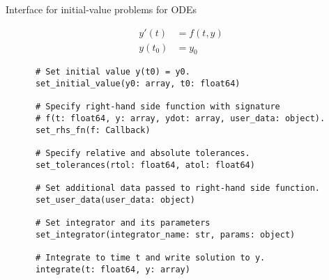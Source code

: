 \documentclass[
  10pt,
  aspectratio=169,
  english,
]{beamer}
\begin{document}
\begin{frame}[fragile]{Interface for initial-value problems for ODEs}
  \begin{minipage}{\dimexpr0.22\textwidth-2\tabcolsep}
    \begin{align*}
      y'(t)  & = f(t, y) \\
      y(t_0) & = y_0
    \end{align*}
  \end{minipage}
  \begin{minipage}{\dimexpr0.73\textwidth-2\tabcolsep}
    {\footnotesize
    \begin{verbatim}
      # Set initial value y(t0) = y0.
      set_initial_value(y0: array, t0: float64)

      # Specify right-hand side function with signature
      # f(t: float64, y: array, ydot: array, user_data: object).
      set_rhs_fn(f: Callback)

      # Specify relative and absolute tolerances.
      set_tolerances(rtol: float64, atol: float64)

      # Set additional data passed to right-hand side function.
      set_user_data(user_data: object)

      # Set integrator and its parameters
      set_integrator(integrator_name: str, params: object)

      # Integrate to time t and write solution to y.
      integrate(t: float64, y: array)
    \end{verbatim}
    }
  \end{minipage}
\end{frame}
\end{document}
